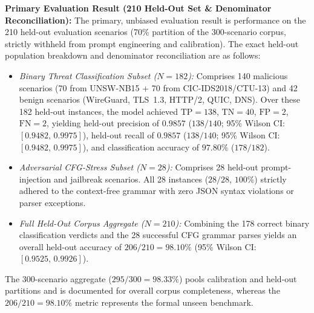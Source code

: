 \documentclass[journal]{IEEEtran}
\renewcommand{\_}{\textunderscore\allowbreak}
\begin{document}
\textbf{Primary Evaluation Result (210 Held-Out Set \& Denominator Reconciliation):}
The primary, unbiased evaluation result is performance on the 210 held-out evaluation scenarios
(70\% partition of the 300-scenario corpus, strictly withheld from prompt engineering and calibration).
The exact held-out population breakdown and denominator reconciliation are as follows:
\begin{itemize}
  \item \textit{Binary Threat Classification Subset ($N=182$):} Comprises 140 malicious scenarios (70 from UNSW-NB15 + 70 from CIC-IDS2018/CTU-13) and 42 benign scenarios (WireGuard, TLS~1.3, HTTP/2, QUIC, DNS). Over these 182 held-out instances, the model achieved $\text{TP}=138$, $\text{TN}=40$, $\text{FP}=2$, $\text{FN}=2$, yielding held-out precision of $0.9857$ ($138/140$; 95\% Wilson CI: $[0.9482,\,0.9975]$), held-out recall of $0.9857$ ($138/140$; 95\% Wilson CI: $[0.9482,\,0.9975]$), and classification accuracy of $97.80\%$ ($178/182$).
  \item \textit{Adversarial CFG-Stress Subset ($N=28$):} Comprises 28 held-out prompt-injection and jailbreak scenarios. All 28 instances ($28/28$, $100\%$) strictly adhered to the context-free grammar with zero JSON syntax violations or parser exceptions.
  \item \textit{Full Held-Out Corpus Aggregate ($N=210$):} Combining the 178 correct binary classification verdicts and the 28 successful CFG grammar parses yields an overall held-out accuracy of $206/210 = 98.10\%$ (95\% Wilson CI: $[0.9525,\,0.9926]$).
\end{itemize}
The 300-scenario aggregate ($295/300 = 98.33\%$) pools calibration and held-out partitions and is documented for overall corpus completeness, whereas the $206/210 = 98.10\%$ metric represents the formal unseen benchmark.
\end{document}
